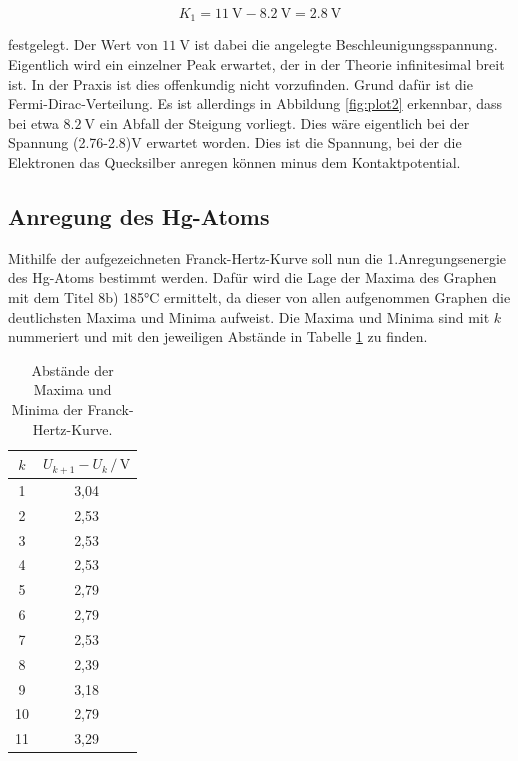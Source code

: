 \begin{equation*}
K_1 = \SI{11}{\volt}-\SI{8.2}{\volt} = \SI{2.8}{\volt}
\end{equation*}

festgelegt. Der Wert von $\SI{11}{\volt}$ ist dabei die angelegte Beschleunigungsspannung.
Eigentlich wird ein einzelner Peak erwartet, der in der Theorie infinitesimal breit ist. In der Praxis 
ist dies offenkundig nicht vorzufinden. Grund dafür ist die Fermi-Dirac-Verteilung. 
Es ist allerdings in Abbildung \ref{fig:plot2} erkennbar, dass bei etwa $\SI{8.2}{\volt}$ ein Abfall der 
Steigung vorliegt. Dies wäre eigentlich bei der Spannung (2.76-2.8)V erwartet worden. Dies ist die Spannung, 
bei der die Elektronen das Quecksilber anregen können minus dem Kontaktpotential. 

\subsection{Anregung des Hg-Atoms}

Mithilfe der aufgezeichneten Franck-Hertz-Kurve soll nun die 1.Anregungsenergie des Hg-Atoms bestimmt 
werden. Dafür wird die Lage der Maxima des Graphen mit dem Titel 8b) 185°C ermittelt, da dieser von
allen aufgenommen Graphen die deutlichsten Maxima und Minima aufweist. Die Maxima und Minima sind mit $k$
nummeriert und mit den jeweiligen Abstände in Tabelle \ref{tab:Max} zu finden. 

\begin{table}
  \centering
  \caption{Abstände der Maxima und Minima der Franck-Hertz-Kurve.}
  \label{tab:Max}
  \begin{tabular}{c c}
  \toprule
  $k$ & $U_{k+1}-U_{k} \,/\, \si{\volt}$\\
  \midrule 
   1 & 3,04\\
   2 & 2,53\\
   3 & 2,53\\
   4 & 2,53\\
   5 & 2,79\\
   6 & 2,79\\
   7 & 2,53\\
   8 & 2,39\\
   9 & 3,18\\
  10 & 2,79\\
  11 & 3,29\\
  \bottomrule
  \end{tabular}
  \end{table}

